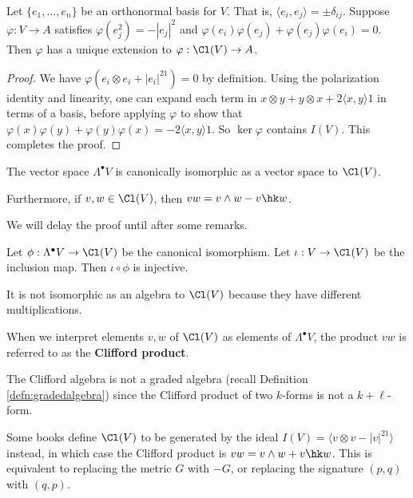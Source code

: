 \begin{cor}
    Let $\{e_1,...,e_n\}$ be an orthonormal basis for $V$. That is, $\langle e_i,e_j\rangle=\pm\delta_{ij}$. Suppose $\varphi : V \to A$ satisfies $\varphi(e_j^2) = -|e_j|^2$ and $\varphi(e_i)\varphi(e_j)+\varphi(e_j)\varphi(e_i)=0$. Then $\varphi$ has a unique extension to $\varphi : \Cl(V)\to A$.
\end{cor}
\begin{proof}
    We have $\varphi(e_i\otimes e_i + |e_i|^21) = 0$ by definition. Using the polarization identity and linearity, one can expand each term in $x\otimes y + y \otimes x + 2\langle x,y\rangle 1$ in terms of a basis, before applying $\varphi$ to show that $\varphi(x)\varphi(y)+\varphi(y)\varphi(x)=-2\langle x,y\rangle 1$. So $\ker \varphi$ contains $I(V)$. This completes the proof.
\end{proof}
\begin{thm}
    The vector space $\Lambda^\bullet V$ is canonically isomorphic as a vector space to $\Cl(V)$.

    Furthermore, if $v,w \in \Cl(V)$, then $vw = v\wedge w -v\hk w$.
\end{thm}
We will delay the proof until after some remarks.
\begin{remark*}
    Let $\phi : \Lambda^\bullet V\to \Cl(V)$ be the canonical isomorphism. Let $\iota : V \to \Cl(V)$ be the inclusion map. Then $\iota\circ \phi$ is injective.
\end{remark*}
\begin{remark*}
    It is not isomorphic as an algebra to $\Cl(V)$ because they have different multiplications.
\end{remark*}
\begin{defn}
    When we interpret elements $v,w$ of $\Cl(V)$ as elements of $\Lambda^\bullet V$, the product $vw$ is referred to as the \textbf{Clifford product}.
\end{defn}
\begin{remark*}
    The Clifford algebra is not a graded algebra (recall Definition \ref{defn:gradedalgebra}) since the Clifford product of two $k$-forms is not a $k+\ell$-form.
\end{remark*}
\begin{remark*}
    Some books define $\Cl(V)$ to be generated by the ideal $I(V) = \langle v\otimes v - |v|^21\rangle$ instead, in which case the Clifford product is $vw = v\wedge w + v\hk w$. This is equivalent to replacing the metric $G$ with $-G$, or replacing the signature $(p,q)$ with $(q,p)$.
\end{remark*}
